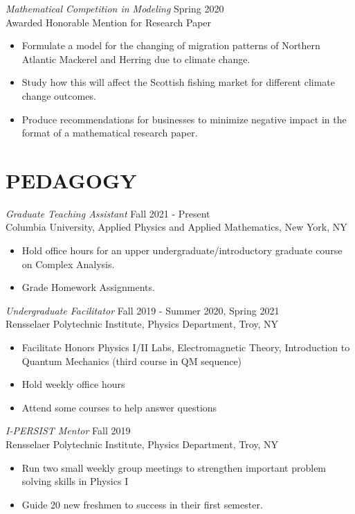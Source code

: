 \documentclass[margin]{rpires}
\begin{document}
\begin{resume}
    {\sl Mathematical Competition in Modeling} \hfill Spring 2020 \\
    Awarded Honorable Mention for Research Paper
    \begin{itemize}  \itemsep -2pt %
        \item Formulate a model for the changing of migration patterns of Northern Atlantic Mackerel and Herring due to climate change.
        \item Study how this will affect the Scottish fishing market for different climate change outcomes.
        \item Produce recommendations for businesses to minimize negative impact in the format of a mathematical research paper.
    \end{itemize}
\newpage
\section{PEDAGOGY}
    {\sl Graduate Teaching Assistant} \hfill Fall 2021 - Present \\
    Columbia University, Applied Physics and Applied Mathematics, New York, NY
    \begin{itemize}  \itemsep -2pt %
        \item Hold office hours for an upper undergraduate/introductory graduate course on Complex Analysis.
        \item Grade Homework Assignments. 
    \end{itemize}    


    {\sl Undergraduate Facilitator} \hfill Fall 2019 - Summer 2020, Spring 2021 \\
    Rensselaer Polytechnic Institute, Physics Department, Troy, NY
    \begin{itemize}  \itemsep -2pt %
        \item Facilitate Honors Physics I/II Labs, Electromagnetic Theory, Introduction to Quantum Mechanics (third course in QM sequence)
        \item Hold weekly office hours
        \item Attend some courses to help answer questions
    \end{itemize}

    {\sl I-PERSIST Mentor} \hfill Fall 2019 \\
    Rensselaer Polytechnic Institute, Physics Department, Troy, NY
    \begin{itemize}  \itemsep -2pt %
        \item Run two small weekly group meetings to strengthen important problem solving skills in Physics I 
        \item Guide 20 new freshmen to success in their first semester.
    \end{itemize}


\end{resume}
\end{document}
